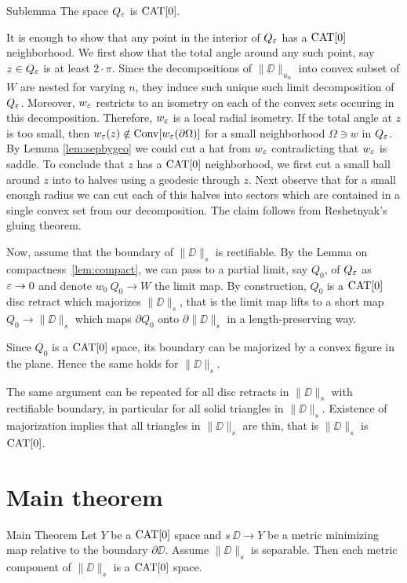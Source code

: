 \documentclass[a4paper,10pt]{amsart}
\begin{document}
\begin{thm}{Sublemma}
The space $Q_\varepsilon$ is $\mathop{\rm CAT}\nolimits[0]$. 
\end{thm}

It is enough to show that any point in the interior of $Q_\varepsilon$ has a $\mathop{\rm CAT}\nolimits[0]$ neighborhood.
We first show that the total angle around any such point, say $z\in Q_\varepsilon$ is at least $2\cdot\pi$.
Since the decompositions of $\|\DD\|_{u_n}$ into convex subset of $W$ are nested for varying $n$, they
induce such unique such limit decomposition of $Q_\varepsilon$. Moreover, $w_\varepsilon$ restricts to an isometry on each 
of the convex sets occuring in this decomposition. Therefore, $w_\varepsilon$ is a local radial isometry.
If the total angle at $z$ is too small, then $w_\varepsilon(z)\notin\mathop{\rm Conv}\nolimits [w_\varepsilon (\partial\Omega)]$
for a small neighborhood $\Omega\ni w$ in $Q_\varepsilon$. By Lemma \ref{lem:sepbygeo} we could cut a hat from $w_\varepsilon$
contradicting that $w_\varepsilon$ is saddle.
To conclude that $z$ has a $\mathop{\rm CAT}\nolimits[0]$ neighborhood, we first cut a small ball around $z$ into to halves using a geodesic through $z$.
Next observe that for a small enough radius we can cut each of this halves into sectors which are contained in a single convex set
from our decomposition. The claim follows from Reshetnyak's gluing theorem.
\qeds


Now, assume that the boundary of $\|\DD\|_s$ is rectifiable.
By the Lemma on compactness~\ref{lem:compact},
we can pass to a partial limit, say $Q_0$, of $Q_\varepsilon$ as $\varepsilon\to 0$ and denote $w_0\:Q_0\to W$ the limit map.
By construction, $Q_0$ is a $\mathop{\rm CAT}\nolimits[0]$ disc retract which majorizes $\|\DD\|_s$,
that is the limit map lifts to a short map $Q_0\to \|\DD\|_s$ which maps $\partial Q_0$ onto  $\partial \|\DD\|_s$ in a length-preserving way.

Since $Q_0$ is a $\mathop{\rm CAT}\nolimits[0]$ space, its boundary can be majorized by a convex figure in the plane.
Hence the same holds for $\|\DD\|_s$.

The same argument can be repeated for all disc retracts in $\|\DD\|_s$ with rectifiable boundary, in particular for all solid triangles in $\|\DD\|_s$.
Existence of majorization implies that all triangles in $\|\DD\|_s$ are thin, that is $\|\DD\|_s$ is $\mathop{\rm CAT}\nolimits[0]$.
\qeds

\section{Main theorem}

\begin{thm}{Main Theorem}\label{thm:main}
Let $Y$ be a $\mathop{\rm CAT}\nolimits[0]$ space 
and $s\:\DD\to Y$ be a metric minimizing map relative to the boundary $\partial\DD$.
Assume $\|\DD\|_s$  is separable. 
Then each metric component of $\|\DD\|_s$ is a $\mathop{\rm CAT}\nolimits[0]$ space. 
\end{thm}
\end{document}
